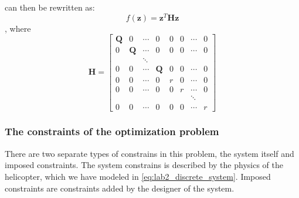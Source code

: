 \documentclass[../main.tex]{subfiles}
\begin{document}
 can then be rewritten as: 
\begin{equation}\label{eq:lab2_quadprog}
	f(\bm z) = \bm z^T \bm H \bm z
\end{equation}, where
\begin{equation}\label{eq:lab2_H}
	\bm H = \begin{bmatrix}
		\bm Q & 0 & \cdots  & 0 & 0 & 0 & \cdots & 0\\
		0 & \bm Q & \cdots  & 0 & 0 & 0 & \cdots & 0\\
		 & & \ddots &  &  &  &  & \\
		0 & 0 & \cdots & \bm Q & 0 & 0  & \cdots & 0\\
		0 & 0 & \cdots & 0 & r & 0  & \cdots & 0\\
		0 & 0 & \cdots & 0 & 0 & r  & \cdots & 0\\
		 & &  &  &  &  & \ddots & \\
		0 & 0 & \cdots & 0 & 0 & 0  & \cdots & r
	\end{bmatrix}
\end{equation}


\subsubsection{The constraints of the optimization problem} \label{sec:lab2_constraints}
There are two separate types of constrains in this problem, the system itself and imposed constraints. The system constrains is described by the physics of the helicopter, which we have modeled in \cref{eq:lab2_discrete_system}. Imposed constraints are constraints added by the designer of the system. 
\end{document}
